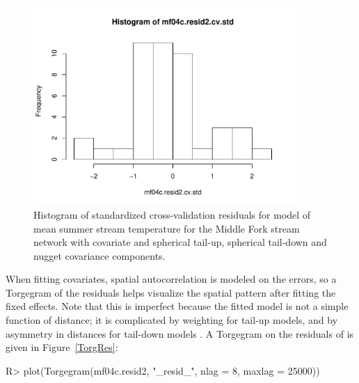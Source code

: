 \documentclass[nojss]{jss}
\renewenvironment{Schunk}{\vspace{\topsep}}{\vspace{\topsep}}
\begin{document}
\begin{figure}[htbp]
  \begin{center}
    \includegraphics[keepaspectratio=true, width = 100mm]{Figures/jss984Fig-Residuals}
    \caption{Histogram of standardized cross-validation residuals for
      model  of mean summer stream temperature for the Middle Fork
      stream network with  covariate and spherical tail-up, spherical tail-down and nugget covariance components.\label{Residuals}}
  \end{center}
\end{figure}

When fitting covariates, spatial autocorrelation is modeled on the
errors, so a Torgegram of the residuals helps visualize the spatial
pattern after fitting the fixed effects.  Note that this is imperfect
because the fitted model is not a simple function of distance; it is
complicated by weighting for tail-up models, and by asymmetry in
distances for tail-down models \citep[see][Figure
7]{Ver:Pete:Move:2010}. A Torgegram on the residuals of
 is given in Figure~\ref{TorgRes}:

\begin{Schunk}
\begin{Sinput}
R> plot(Torgegram(mf04c.resid2, "_resid_", nlag = 8, maxlag = 25000))
\end{Sinput}
\end{Schunk}
\end{document}
